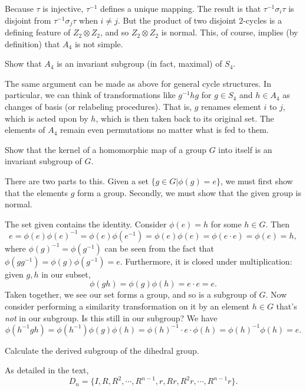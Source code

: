 \documentclass[../group-theory-in-a-nutshell-for-physicists.tex]{subfiles}
\begin{document}
\begin{questions}
\begin{solution}
Because $\tau$ is injective, $\tau^{- 1}$ defines a unique mapping.
The result is that $\tau^{- 1}\sigma_{i}\tau$ is disjoint from
$\tau^{- 1}\sigma_{j}\tau$ when $i \neq j$. But the product of two
disjoint $2$-cycles is a defining feature of $Z_{2} \otimes Z_{2}$,
and so $Z_{2} \otimes Z_{2}$ is normal. This, of course, implies (by
definition) that $A_{4}$ is not simple.
\end{solution}

\question Show that $A_{4}$ is an invariant subgroup (in fact, maximal) of
$S_{4}$.

\begin{solution}
The same argument can be made as above for general cycle structures. In
particular, we can think of transformations like $g^{- 1}hg$ for
$g \in S_{4}$ and $h \in A_{4}$ as changes of basis (or relabeling
procedures). That is, $g$ renames element $i$ to $j$, which is
acted upon by $h$, which is then taken back to its original set. The
elements of $A_{4}$ remain even permutations no matter what is fed to
them.
\end{solution}

\question Show that the kernel of a homomorphic map of a group $G$ into itself
is an invariant subgroup of $G$.

\begin{solution}
There are two parts to this. Given a set $\{ g \in G|\phi(g) = e\}$,
we must first show that the elements $g$ form a group. Secondly, we
must show that the given group is normal.

The set given contains the identity. Consider $\phi(e) = h$ for some
$h \in G$. Then
\[
e = \phi(e)\phi(e)^{- 1} = \phi(e)\phi(e^{- 1}) = \phi(e)\phi(e) = \phi(e \cdot e) = \phi(e) = h,
\]
where $\phi(g)^{- 1} = \phi(g^{- 1})$ can be seen from the fact that
$\phi(gg^{- 1}) = \phi(g)\phi(g^{- 1}) = e$. Furthermore, it is closed
under multiplication: given $g,h$ in our subset,
\[
\phi(gh) = \phi(g)\phi(h) = e \cdot e = e.
\]
Taken together, we see our set forms a group, and so is a subgroup of
$G$. Now consider performing a similarity transformation on it by an
element $h \in G$ that's \emph{not} in our subgroup. Is this still in
our subgroup? We have
\[
\phi(h^{- 1}gh) = \phi(h^{- 1})\phi(g)\phi(h) = \phi(h)^{- 1} \cdot e \cdot \phi(h) = \phi(h)^{- 1}\phi(h) = e.
\]
\end{solution}

\question Calculate the derived subgroup of the dihedral group.

\begin{solution}
As detailed in the text,
\[
D_{n} = \{ I,R,R^{2},\cdots,R^{n - 1},r,Rr,R^{2}r,\cdots,R^{n - 1}r\}.
\]


\end{solution}
\end{questions}
\end{document}
